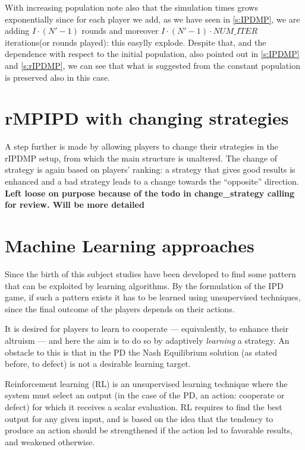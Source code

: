 \documentclass[journal,a4paper,10pt,twoside]{IEEEtran} %
\begin{document}
With increasing population note also that the simulation times grows exponentially since for each player we add, as we have seen in \autoref{s:IPDMP}, we are adding $I\cdot(N'-1)$ rounds and moreover $I\cdot(N'-1)\cdot{NUM\_ITER}$ iterations(or rounds played): this easylly explode. Despite that, and the dependence with respect to the initial population, also pointed out in \autoref{s:IPDMP} and \autoref{s:rIPDMP}, we can see that what is suggested from the constant population is preserved also in this case.

\section{rMPIPD with changing strategies} \label{s:crIPDMP}
A step further is made by allowing players to change their strategies in the rIPDMP setup, from which the main structure is unaltered. The change of strategy is again based on players' ranking: a strategy that gives good results is enhanced and a bad strategy leads to a change towards the ``opposite'' direction.
\textbf{Left loose on purpose because of the todo in change_strategy calling for review. Will be more detailed}

\section{Machine Learning approaches} \label{s:ml}
Since the birth of this subject studies have been developed to find some pattern that can be exploited by learning algorithms.
By the formulation of the IPD game, if such a pattern exists it has to be learned using unsupervised techniques, since the final outcome of the players depends on their actions.

It is desired for players to learn to cooperate --- equivalently, to enhance their altruism --- and here the aim is to do so by adaptively \textit{learning} a strategy. An obstacle to this is that in the PD the Nash Equilibrium solution (as stated before, to defect) is not a desirable learning target. \cite{coopSeqRL}

Reinforcement learning (RL) is an unsupervised learning technique where the system must select an output (in the case of the PD, an action: cooperate or defect) for which it receives a scalar evaluation. RL requires to find the best output for any given input, and is based on the idea that the tendency to produce an action should be strengthened if the action led to favorable results, and weakened otherwise. \cite{sandholmRL}
\end{document}
